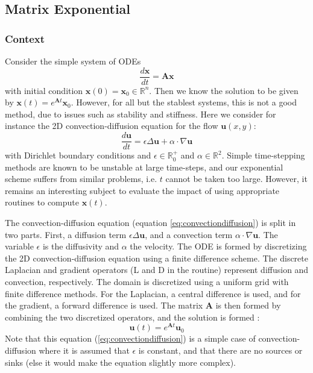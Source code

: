 \documentclass[11pt]{article}
\numberwithin{equation}{section}
\begin{document}
\subsection{Matrix Exponential}\label{sec:matrixexp}
\subsubsection{Context}
Consider the simple system of ODEs
\begin{equation}\label{eq:ode}
    \frac{d\mathbf{x}}{dt} = \mathbf{A}\mathbf{x}
\end{equation}
with initial condition $\mathbf{x}(0) = \mathbf{x}_0\in\mathbb{R}^n$. Then we know the solution to be given by $\mathbf{x}(t)=e^{\mathbf{A}t}\mathbf{x}_0$. However, for all but the stablest systems, this is not a good method, due to issues such as stability and stiffness. Here we consider for instance the 2D convection-diffusion equation for the flow $\mathbf{u}(x,y)$:
\begin{equation}\label{eq:convectiondiffusion}
    \frac{d \mathbf{u}}{d t}=\epsilon\Delta\mathbf{u}+\alpha\cdot\nabla\mathbf{u}
\end{equation}
with Dirichlet boundary conditions and $\epsilon\in\mathbb{R}^{+}_0$ and $\alpha\in\mathbb{R}^2$. Simple time-stepping methods are known to be unstable at large time-steps, and our exponential scheme suffers from similar problems, i.e. $t$ cannot be taken too large. However, it remains an interesting subject to evaluate the impact of using appropriate routines to compute $\mathbf{x}(t)$.

The convection-diffusion equation (equation \ref{eq:convectiondiffusion}) is split in two parts. First, a diffusion term $\epsilon\Delta\mathbf{u}$, and a convection term $\alpha\cdot\nabla\mathbf{u}$. The variable $\epsilon$ is the diffusivity and $\alpha$ the velocity. The ODE is formed by discretizing the 2D convection-diffusion equation using a finite difference scheme. The discrete Laplacian and gradient operators (L and D in the routine) represent diffusion and convection, respectively. The domain is discretized using a uniform grid with finite difference methods. For the Laplacian, a central difference is used, and for the gradient, a forward difference is used. The matrix $\mathbf{A}$ is then formed by combining the two discretized operators, and the solution is formed :
\begin{equation}\label{eq:odesolution}
    \mathbf{u}(t) = e^{\mathbf{A}t}\mathbf{u}_0
\end{equation}
Note that this equation (\ref{eq:convectiondiffusion}) is a simple case of convection-diffusion where it is assumed that $\epsilon$ is constant, and that there are no sources or sinks (else it would make the equation slightly more complex). 
\end{document}
